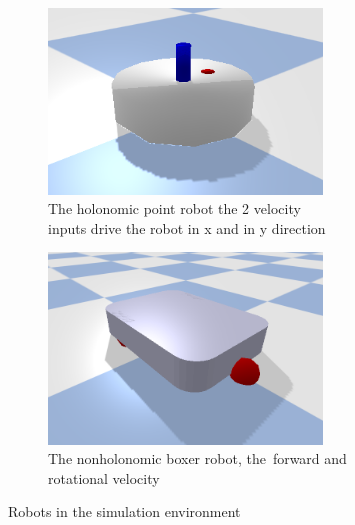 \begin{figure}[H]
    \centering
    \begin{subfigure}{.5\textwidth}
    \centering
    \includegraphics[width=0.8\textwidth]{figures/introduction/point_robot.png}
    \caption{The holonomic point robot the 2 velocity\\inputs drive the robot in \gls{x} and in \gls{y} direction}%
    \label{subfig:example_point_robot}
    \end{subfigure}%
    \begin{subfigure}{.5\textwidth}
    \centering
    \includegraphics[width=0.8\textwidth]{figures/introduction/boxer_robot.png}
    \caption{The nonholonomic boxer robot, the\ forward and rotational velocity}%
    \label{subfig:example_boxer_robot}
    \end{subfigure}%
    \caption{Robots in the simulation environment}%
    \label{fig:example_robots}
\end{figure}

